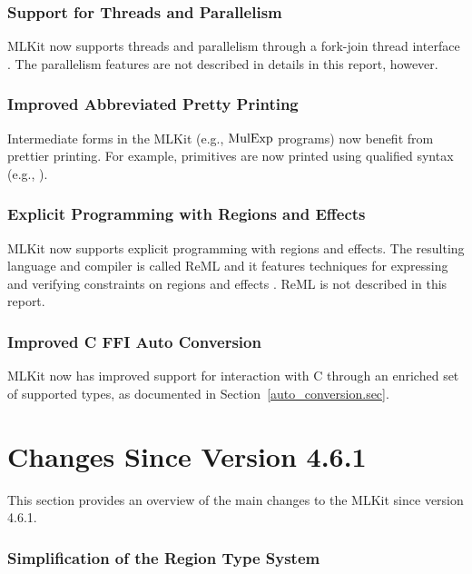 \documentclass[12pt]{book}
\begin{document}
\subsubsection{Support for Threads and Parallelism}

MLKit now supports threads and parallelism through a fork-join thread interface
\cite{10.1145/3591256}. The parallelism features are not described in details in
this report, however.

\subsubsection{Improved Abbreviated Pretty Printing}

Intermediate forms in the MLKit (e.g., $\hbox{\rm MulExp}$ programs) now benefit from
prettier printing. For example, primitives are now printed using qualified
syntax (e.g., ).

\subsubsection{Explicit Programming with Regions and Effects}

MLKit now supports explicit programming with regions and effects. The
resulting language and compiler is called ReML and it features techniques for
expressing and verifying constraints on regions and effects
\cite{10.1145/3632921}. ReML is not described in this report.

\subsubsection{Improved C FFI Auto Conversion}

MLKit now has improved support for interaction with C through an enriched
set of supported types, as documented in Section~\ref{auto_conversion.sec}.

\section{Changes Since Version 4.6.1}
%

This section provides an overview of the main changes to the MLKit since version
4.6.1.

\subsubsection*{Simplification of the Region Type System}
\end{document}
